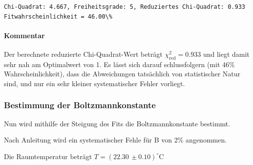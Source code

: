     \begin{Verbatim}[commandchars=\\\{\}]
Chi-Quadrat: 4.667, Freiheitsgrade: 5, Reduziertes Chi-Quadrat: 0.933
Fitwahrscheinlichkeit = 46.00\%
    \end{Verbatim}

    \hypertarget{kommentar}{%
\paragraph{Kommentar}\label{kommentar}}

Der berechnete reduzierte Chi-Quadrat-Wert beträgt
\(\chi^2_{\text{red}} = 0.933\) und liegt damit sehr nah am Optimalwert
von 1. Es lässt sich darauf schlussfolgern (mit 46\%
Wahrscheinlichkeit), dass die Abweichungen tatsächlich von statistischer
Natur sind, und nur ein sehr kleiner systematischer Fehler vorliegt.

    \hypertarget{bestimmung-der-boltzmannkonstante}{%
\subsubsection{Bestimmung der
Boltzmannkonstante}\label{bestimmung-der-boltzmannkonstante}}

Nun wird mithilfe der Steigung des Fits die Boltzmannkonstante bestimmt.

Nach Anleitung wird ein systematischer Fehle für B von 2\% angenommen.

Die Raumtemperatur beträgt \(T = (22.30\,\pm 0.10)^\circ\text{C}\)

